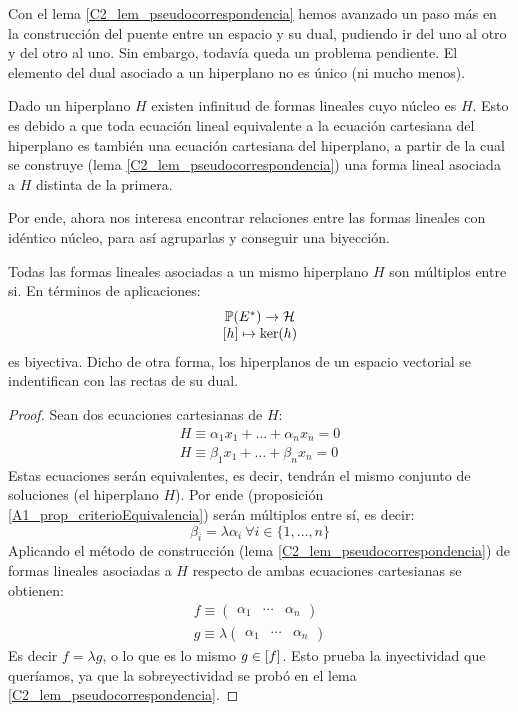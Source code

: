 Con el lema \ref{C2_lem_pseudocorrespondencia} hemos avanzado un paso más en la construcción del puente entre un espacio y su dual, pudiendo ir del uno al otro y del otro al uno. Sin embargo, todavía queda un problema pendiente. El elemento del dual asociado a un hiperplano no es único (ni mucho menos).

Dado un hiperplano $H$ existen infinitud de formas lineales cuyo núcleo es $H$. Esto es debido a que toda ecuación lineal equivalente a la ecuación cartesiana del hiperplano es también una ecuación cartesiana del hiperplano, a partir de la cual se construye (lema \ref{C2_lem_pseudocorrespondencia}) una forma lineal asociada a $H$ distinta de la primera.

Por ende, ahora nos interesa encontrar relaciones entre las formas lineales con idéntico núcleo, para así agruparlas y conseguir una biyección.

\begin{lem}
	\label{C2_lem_correspondencia}
	Todas las formas lineales asociadas a un mismo hiperplano $H$ son múltiplos entre si. En términos de aplicaciones:
	\[\begin{array}{c}
	\mathbb{P}(E^*)\to\mathcal{H}\\
	\left [ h \right ]\mapsto \ker(h)
	\end{array}
	\]
	es biyectiva. Dicho de otra forma, los hiperplanos de un espacio vectorial se indentifican con las rectas de su dual.
\end{lem}
\begin{proof}
	Sean dos ecuaciones cartesianas de $H$:
	\begin{gather}
		H\equiv \alpha_1x_1+\dots+\alpha_nx_n=0\\
		H\equiv \beta_1x_1+\dots+\beta_nx_n=0
	\end{gather}
	Estas ecuaciones serán equivalentes, es decir, tendrán el mismo conjunto de soluciones (el hiperplano $H$). Por ende (proposición \ref{A1_prop_criterioEquivalencia}) serán múltiplos entre sí, es decir:
	\begin{equation}
		\beta_i = \lambda\alpha_i\ \forall i\in\{1,\dots,n\}
	\end{equation}
	Aplicando el método de construcción (lema \ref{C2_lem_pseudocorrespondencia}) de formas lineales asociadas a $H$ respecto de ambas ecuaciones cartesianas se obtienen:
	\begin{gather}
		f\equiv\begin{pmatrix}
			\alpha_1 & \cdots & \alpha_n
		\end{pmatrix}\\
		g\equiv\lambda\begin{pmatrix}
			\alpha_1 & \cdots & \alpha_n
		\end{pmatrix}
	\end{gather}
	Es decir $f=\lambda g$, o lo que es lo mismo $g\in\left [ f \right ]$. Esto prueba la inyectividad que queríamos, ya que la sobreyectividad se probó en el lema \ref{C2_lem_pseudocorrespondencia}.
\end{proof}


